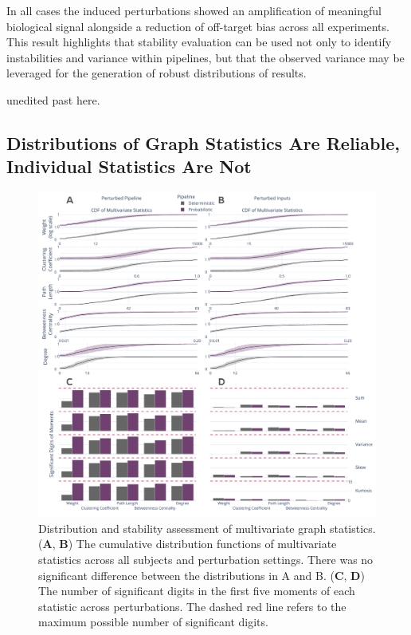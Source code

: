\documentclass[fleqn,10pt]{SelfArx} %
\begin{document}
In all cases the induced perturbations showed an amplification of meaningful biological signal alongside a reduction of
off-target bias across all experiments. This result highlights that stability evaluation can be used not only to
identify instabilities and variance within pipelines, but that the observed variance may be leveraged for the
generation of robust distributions of results.

{\color{red} unedited past here}.

\subsection*{Distributions of Graph Statistics Are Reliable, Individual Statistics Are Not}
\begin{figure}[bt!]\centering
\includegraphics[width=\linewidth]{figures/fig2_multivariate_differences.pdf}
\caption{Distribution and stability assessment of multivariate graph statistics. (\textbf{A}, \textbf{B}) The
cumulative distribution functions of multivariate statistics across all subjects and perturbation settings. There was
no significant difference between the distributions in A and B. (\textbf{C}, \textbf{D}) The number of significant
digits in the first five moments of each statistic across perturbations. The dashed red line refers to the maximum
possible number of significant digits.}
\label{fig:multivar}
\end{figure}
\end{document}
